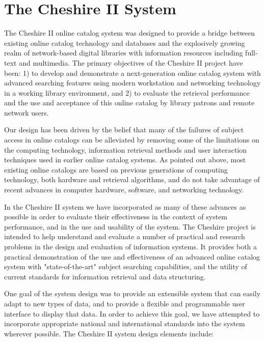 \section{The Cheshire II System}

The Cheshire II online catalog system was designed to provide a bridge
between existing online catalog technology and databases and the
explosively growing realm of network-based digital libraries with
information resources including full-text and multimedia.  The primary
objectives of the Cheshire II project have been: 1) to develop and
demonstrate a next-generation online catalog system with advanced
searching features using modern workstation and networking technology
in a working library environment, and 2) to evaluate the retrieval
performance and the use and acceptance of this online catalog by
library patrons and remote network users.

Our design has been driven by the belief that many of the failures
of subject access in online catalogs can be alleviated by removing
some of the limitations on the computing technology, information
retrieval methods and user interaction techniques used in earlier
online catalog systems. As pointed out above, most existing online
catalogs are based on previous generations of computing technology,
both hardware and retrieval algorithms, and do not take advantage of
recent advances in computer hardware, software, and networking
technology.

In the Cheshire II system we have incorporated as many of these
advances as possible in order to evaluate their effectiveness in the
context of system performance, and in the use and usability of the
system.  The Cheshire project is intended to help understand and
evaluate a number of practical and research problems in the design and
evaluation of information systems. It provides both a practical
demonstration of the use and effectiveness of an advanced online
catalog system with "state-of-the-art" subject searching capabilities,
and the utility of current standards for information retrieval and
data structuring.

One goal of the system design was to provide an extensible system
that can easily adapt to new types of data, and to provide a
flexible and programmable user interface to display that data.
In order to achieve this goal, we have attempted to incorporate 
appropriate national and international standards into the system 
wherever possible. The Cheshire II system design elements include:

